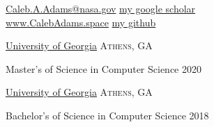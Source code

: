 \documentclass[10pt,a4paper]{article}
\begin{document}
\sloppy  %



\nobreakvspace{0.6em}  %

\noindent
\href{mailto:CalebAshmoreAdams@gmail.com}{Caleb.A.Adams\mbox{}@\mbox{}nasa.gov}
\hspace*{0pt}\hfill \href{https://scholar.google.com/citations?hl=en&user=Yuh1UscAAAAJ}{my google scholar {\color{bluegreen} \faGoogle}}
\\
\href{http://calebadams.space}{www.CalebAdams.space}
\hspace*{0pt}\hfill \href{https://github.com/piepieninja}{my github {\color{bluegreen} \faGithub}}
\\

\spacedhrule{0.5em}{-0.4em}
\spacedhrule{0.5em}{-0.4em}


\headedsection
  {\href{http://uga.edu}{University of Georgia}}
  {\textsc{Athens, GA}} {%
  \headedsubsection
    {Master's of Science in Computer Science}
    {2020}
    {\bodytext{}}

  }
\headedsection
  {\href{http://uga.edu}{University of Georgia}}
  {\textsc{Athens, GA}} {%
  \headedsubsection
    {Bachelor's of Science in Computer Science}
    {2018}
    {\bodytext{}}

  }



\spacedhrule{0em}{-0.4em}
\end{document}
